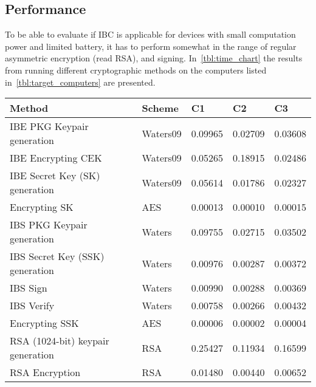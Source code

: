 \subsection{Performance}\label{ibc-performance}
To be able to evaluate if \gls{IBC} is applicable for devices with small computation power and limited battery, it has to perform somewhat in the range of regular asymmetric encryption (read RSA), and signing. 
In~\autoref{tbl:time_chart} the results from running different cryptographic methods on the computers listed in~\autoref{tbl:target_computers} are presented.

\begin{table}[h]
  \begin{tabular}[c]{lllll}
  Method                                      & Scheme          & C1          & C2           & C3              \\ \hline
  IBE PKG Keypair generation                  & Waters09        & 0.09965     & 0.02709      & 0.03608         \\ %
  IBE Encrypting CEK                          & Waters09        & 0.05265     & 0.18915      & 0.02486         \\ %
  IBE Secret Key (SK) generation              & Waters09        & 0.05614     & 0.01786      & 0.02327         \\ %
  Encrypting SK                               & AES             & 0.00013     & 0.00010      & 0.00015         \\ %
  IBS PKG Keypair generation                  & Waters          & 0.09755     & 0.02715      & 0.03502         \\ %
  IBS Secret Key (SSK) generation             & Waters          & 0.00976     & 0.00287      & 0.00372         \\ %
  IBS Sign                                    & Waters          & 0.00990     & 0.00288      & 0.00369         \\ %
  IBS Verify                                  & Waters          & 0.00758     & 0.00266      & 0.00432         \\ %
  Encrypting SSK                              & AES             & 0.00006     & 0.00002      & 0.00004         \\ %
  RSA (1024-bit) keypair generation           & RSA             & 0.25427     & 0.11934      & 0.16599         \\ %
  RSA Encryption                              & RSA             & 0.01480     & 0.00440      & 0.00652         \\ %

\end{tabular}
\end{table}
